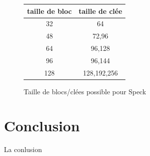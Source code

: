 			\vspace{0.5cm}

			\begin{figure}[!h]
				\centering
				\begin{tabular}{cc}
					taille de bloc & taille de clée \\
					\hline
					32 & 64 \\
					\hline
					48 & 72,96 \\
					\hline
					64 & 96,128 \\
					\hline
					96 & 96,144 \\
					\hline
					128 & 128,192,256 \\
					\hline
				\end{tabular}
				\caption{Taille de blocs/clées possible pour Speck}
			 	\label{tailleSpeck}
			\end{figure}

			\vspace{0.5cm}


\newpage
\part*{Conclusion}

		La conlusion
